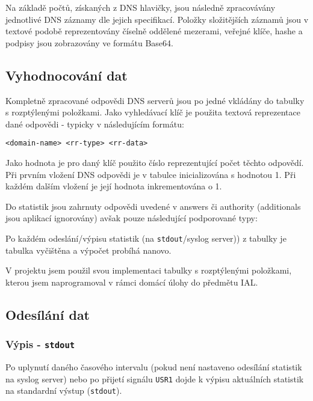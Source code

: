 \documentclass[11pt]{article}
\begin{document}
	Na základě počtů, získaných z DNS hlavičky, jsou následně zpracovávány jednotlivé DNS záznamy dle jejich specifikací\cite{RFC1035}\cite{RFC4034}.
	Položky složitějších záznamů jsou v textové podobě reprezentovány číselně oddělené mezerami, veřejné klíče, hashe a podpisy jsou zobrazovány ve formátu Base64.
	
	\subsection{Vyhodnocování dat}
	Kompletně zpracované odpovědi DNS serverů jsou po jedné vkládány do tabulky s rozptýlenými položkami.
	Jako vyhledávací klíč je použita textová reprezentace dané odpovědi - typicky v následujícím formátu:
	
	\begin{verbatim}
<domain-name> <rr-type> <rr-data>
	\end{verbatim}
	
	Jako hodnota je pro daný klíč použito číslo reprezentující počet těchto odpovědí.
	Při prvním vložení DNS odpovědi je v tabulce inicializována s hodnotou 1.
	Při každém dalším vložení je její hodnota inkrementována o 1.
	
	Do statistik jsou zahrnuty odpovědi uvedené v answers či authority (additionals jsou aplikací ignorovány) avšak pouze následující podporované typy:
	
	
	Po každém odeslání/výpisu statistik (na \texttt{stdout}/syslog server)) z tabulky je tabulka vyčištěna a výpočet probíhá nanovo.
	
	V projektu jsem použil svou implementaci tabulky s rozptýlenými položkami, kterou jsem naprogramoval v rámci domácí úlohy do předmětu IAL.
	
	
	\subsection{Odesílání dat} \label{section:data-sending}
	\subsubsection{Výpis - \texttt{stdout}}
	Po uplynutí daného časového intervalu (pokud není nastaveno odesílání statistik na syslog server) nebo po přijetí signálu \texttt{USR1} dojde k výpisu aktuálních statistik na standardní výstup (\texttt{stdout}).
	
\end{document}
